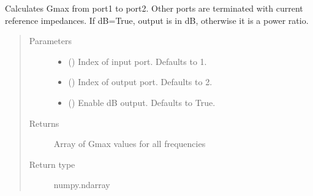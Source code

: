 \documentclass[letterpaper,10pt,english]{sphinxmanual}
\begin{document}
\begin{fulllineitems}

\begin{fulllineitems}
\label{\detokenize{touchstone:touchstone.spfile.gmax}}
Calculates Gmax from port1 to port2. Other ports are terminated with current reference impedances. If dB=True, output is in dB, otherwise it is a power ratio.
\begin{quote}\begin{description}
\item[{Parameters}] \leavevmode\begin{itemize}
\item {} 
 (\sphinxstyleliteralemphasis{\sphinxupquote{, }}) \textendash{} Index of input port. Defaults to 1.

\item {} 
 (\sphinxstyleliteralemphasis{\sphinxupquote{, }}) \textendash{} Index of output port. Defaults to 2.

\item {} 
 (\sphinxstyleliteralemphasis{\sphinxupquote{, }}) \textendash{} Enable dB output. Defaults to True.

\end{itemize}

\item[{Returns}] \leavevmode
Array of Gmax values for all frequencies

\item[{Return type}] \leavevmode
numpy.ndarray

\end{description}\end{quote}

\end{fulllineitems}



\end{fulllineitems}
\end{document}
